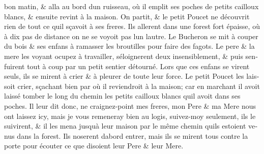 \documentclass[14pt,a4paper]{memoir}
\begin{document}
{{\begin{otherlanguage}{french}
bon matin, \& alla au bord d\textquotesingle un ruisseau, où il emplit
ses poches de petits cailloux blancs, \& ensuite revint à la maison. On
partit, \& le petit Poucet ne découvrit rien de tout ce
qu\textquotesingle il sçavoit à ses freres. Ils allerent dans une forest
fort épaisse, où à dix pas de distance on ne se voyoit pas
l\textquotesingle un l\textquotesingle autre. Le Bucheron se mit à
couper du bois \& ses enfans à ramasser les broutilles pour faire des
fagots. Le pere \& la mere les voyant ocupez à travailler,
s\textquotesingle éloignerent d\textquotesingle eux insensiblement, \&
puis s\textquotesingle enfuirent tout à coup par un petit sentier
détourné. Lors que ces enfans se virent seuls, ils se mirent à crier \&
à pleurer de toute leur force. Le petit Poucet les laissoit crier,
sçachant bien par où il reviendroit à la maison; car en marchant il
avoit laissé tomber le long du chemin les petits cailloux blancs
qu\textquotesingle il avoit dans ses poches. Il leur dit donc, ne
craignez-point mes freres, mon Pere \& ma Mere nous ont laissez icy,
mais je vous remeneray bien au logis, suivez-moy seulement, ils le
suivirent, \& il les mena jusqu\textquotesingle à leur maison par le
même chemin qu\textquotesingle ils estoient venus dans la forest. Ils
n\textquotesingle oserent d\textquotesingle abord entrer, mais ils se
mirent tous contre la porte pour écouter ce que disoient leur Pere \&
leur Mere.


\end{otherlanguage}}}
\end{document}
